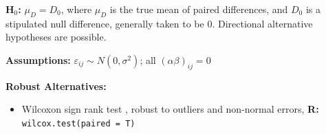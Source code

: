 \documentclass[12pt,english]{article}\usepackage[]{graphicx}\usepackage[table]{xcolor}
\begin{document}
\noindent \textbf{H$_0$:} $\mu_D = D_0$, where $\mu_D$ is the true mean of paired differences, and $D_0$ is a stipulated null difference, generally taken to be 0.  Directional alternative hypotheses are possible.

\vspace{0.1in}
\noindent \textbf{Assumptions:} $\varepsilon_{ij} \sim N(0, \sigma^2)$; all $(\alpha\beta)_{ij} = 0$
\vspace{0.1in}

\noindent \textbf{Robust Alternatives:}
\begin{small}
\begin{itemize}
\item Wilcoxon sign rank test \citep{wilcoxon1945}, robust to outliers and non-normal errors, \textbf{R:} \texttt{wilcox.test(paired = T)}
\end{itemize}
\end{small}
\vspace{0.1in}
\end{document}
